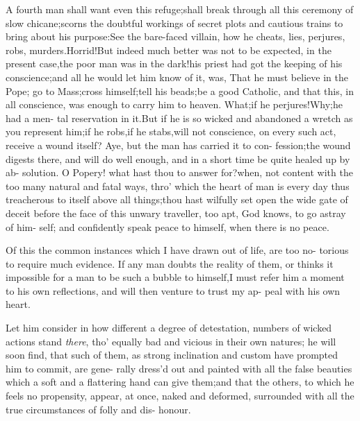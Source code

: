 \documentclass{article}
\begin{document}
\lqq A fourth man shall want even this\break
\lqq refuge;\tsk shall break through all this\break
\lqq ceremony of slow chicane;\tsk scorns\break
\lqq the doubtful workings of secret plots\break
\lqq and cautious trains to bring about his\break
\lqq purpose:\tsh See the bare-faced villain,\break
\lqq how he cheats, lies, perjures, robs,\break
\lqq murders.\tsh Horrid!\tsh But indeed\break
\lqq much better was not to be expected,\break
\lqq in the present case,\tsk the poor man\break
\lqq was in the dark!\tsk his priest had got
\lqq the keeping of his conscience;\tsh and\break
\lqq all he would let him know of it, was,\break
\lqq That he must believe in the Pope;\tsk\break
\lqq go to Mass;\tsk cross himself;\tsk tell his\break
\lqq beads;\tsh be a good Catholic, and\break
\lqq that this, in all conscience, was enough\break
\lqq to carry him to heaven.  What;\tsk if\break
\lqq he perjures!\tsk Why;\tsk he had a men-\break
\lqq tal reservation in it.\tsk But if he is so\break
\lqq wicked and abandoned a wretch as\break
\lqq you represent him;\tsk if he robs,\tsk if\break
\lqq he stabs,\tsk will not conscience, on every 
\lqq such act, receive a wound itself? Aye,\break
\lqq \tsk but the man has carried it to con-\break
\lqq fession;\tsk the wound digests there,\break
\lqq and will do well enough, and in a\break
\lqq short time be quite healed up by ab-\break
\lqq solution. O Popery! what hast thou\break
\lqq to answer for?\tsk when, not content\break
\lqq with the too many natural and fatal\break
\lqq ways, thro’ which the heart of man is
\lqq every day thus treacherous to itself\break
\lqq above all things;\tsk thou hast wilfully\break
\lqq set open the wide gate of deceit before\break
\lqq the face of this unwary traveller, too\break
\lqq apt, God knows, to go astray of him-\break
\lqq self; and confidently speak peace to\break
\lqq himself, when there is no peace.

\lqq Of this the common instances which\break
\lqq I have drawn out of life, are too no-\break
\lqq torious to require much evidence. If\break
\lqq any man doubts the reality of them,\break
\lqq or thinks it impossible for a man to be\break
\lqq such a bubble to himself,\tsk I must refer\break
\lqq him a moment to his own reflections,\break
\lqq and will then venture to trust my ap-\break
\lqq peal with his own heart.  

\lqq Let him consider in how different\break
\lqq a degree of detestation, numbers of\break
\lqq wicked actions stand \textit{there}, tho’ equally
\lqq bad and vicious in their own natures;\break
\lqq \tsk he will soon find, that such of them,\break
\lqq as strong inclination and custom have\break
\lqq prompted him to commit, are gene-\break
\lqq rally dress’d out and painted with all\break
\lqq the false beauties which a soft and a\break
\lqq flattering hand can give them;\tsk and\break
\lqq that the others, to which he feels no\break
\lqq propensity, appear, at once, naked and\break
\lqq deformed, surrounded with all the\break
\lqq true circumstances of folly and dis-\break
\lqq honour.
\end{document}
